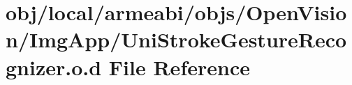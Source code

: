 \hypertarget{objs_2_open_vision_2_img_app_2_uni_stroke_gesture_recognizer_8o_8d}{\section{obj/local/armeabi/objs/\-Open\-Vision/\-Img\-App/\-Uni\-Stroke\-Gesture\-Recognizer.o.\-d \-File \-Reference}
\label{objs_2_open_vision_2_img_app_2_uni_stroke_gesture_recognizer_8o_8d}
}
